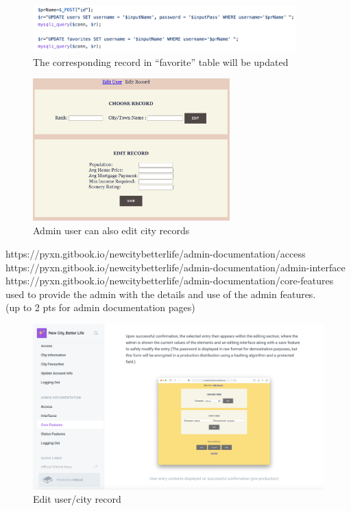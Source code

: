 \documentclass[12pt, letterpaper]{article}
\begin{document}
 \begin{figure}[htbp]
	\centering
	\includegraphics[width=4in]{images/q17-2.png}
	\caption{The corresponding record in “favorite” table will be updated}
 \end{figure}
 
 \begin{figure}[htbp]
	\centering
	\includegraphics[width=3in]{images/q17-3.png}
	\caption{Admin user can also edit city records}
 \end{figure}

 \newpage

https://pyxn.gitbook.io/newcitybetterlife/admin-documentation/access
\\https://pyxn.gitbook.io/newcitybetterlife/admin-documentation/admin-interface
\\https://pyxn.gitbook.io/newcitybetterlife/admin-documentation/core-features
\\used to provide the admin with the details and use of the admin features.
\\(up to 2 pts for admin documentation pages)

\begin{figure}[htbp]
	\centering
	\includegraphics[width=5in]{images/q18-1.png}
	\caption{Edit user/city record}
 \end{figure}
 
\end{document}
